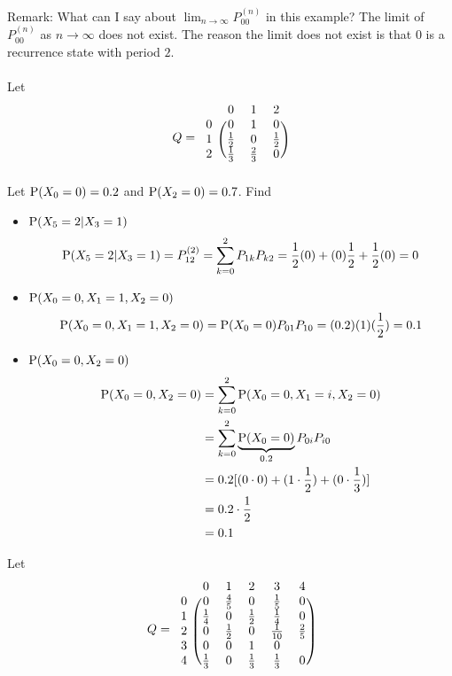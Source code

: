 \documentclass[12pt]{article}
\begin{document}
Remark: What can I say about $\lim_{n\to\infty} P_{00}^{(n)}$ in this example? The limit of $P_{00}^{(n)}$ as $n\to\infty$ does not exist. The reason the limit does not exist is that $0$ is a recurrence state with period $2$. \\~\\
Let $$Q =  \begin{blockarray}{cccc}
&0&1&2 \\ \begin{block}{c(ccc)}
0 & 0 & 1 & 0 \\
1 & \frac{1}{2} & 0 & \frac{1}{2} \\ 
2 & \frac{1}{3} & \frac{2}{3} & 0  \\ \end{block} \end{blockarray} $$ 
Let $\mathrm{P}( X_0 = 0 ) = 0.2$ and $\mathrm{P}( X_2 = 0 ) = 0.7$. Find \begin{itemize} 
\item $\mathrm{P}( X_5 = 2 | X_3 = 1 )$ $$ \mathrm{P}( X_5 = 2 | X_3 = 1 ) = P_{12}^{(2)} = \sum_{k=0}^2 P_{1k}P_{k2} = \frac{1}{2}(0) + (0)\frac{1}{2} + \frac{1}{2}(0) = 0 $$ 
\item $\mathrm{P}( X_0 = 0, X_1 = 1, X_2 = 0 )$ $$ \mathrm{P}( X_0 = 0, X_1 = 1, X_2 = 0 ) = \mathrm{P}( X_0 = 0 )P_{01}P_{10} = (0.2)(1)(\frac{1}{2}) = 0.1$$ 
\item $\mathrm{P}( X_0 = 0, X_2 = 0 )$ $$ \begin{aligned} \mathrm{P}( X_0 = 0,X_2 = 0 ) &= \sum_{k=0}^2 \mathrm{P}( X_0 = 0, X_1 = i, X_2 = 0 ) \\ &= \sum_{k=0}^2 \underbrace{\mathrm{P}( X_0 = 0 )}_{0.2}P_{0i}P_{i0} \\ &= 0.2[(0 \cdot 0) + (1 \cdot \frac{1}{2}) + (0 \cdot \frac{1}{3})] \\ &= 0.2 \cdot \frac{1}{2} \\ &= 0.1 \end{aligned} $$ \end{itemize}
Let $$Q =  \begin{blockarray}{cccccc}
&0&1&2&3&4 \\
\begin{block}{c(ccccc)}
0 & 0 & \frac{4}{5} & 0 & \frac{1}{5} & 0 \\
1 & \frac{1}{4} & 0 & \frac{1}{2} & \frac{1}{4} & 0 \\ 
2 & 0 & \frac{1}{2} & 0 & \frac{1}{10} & \frac{2}{5} \\ 
3 & 0 & 0 & 1 & 0 \\
4 & \frac{1}{3} & 0 & \frac{1}{3} & \frac{1}{3} & 0 \\ \end{block} \end{blockarray} $$
\end{document}
